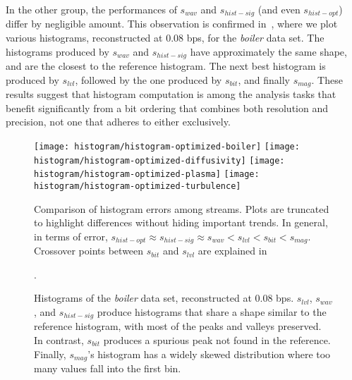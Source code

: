 In the other group, the performances of $s_{wav}$ and $s_{hist-sig}$ (and even $s_{hist-opt}$)
differ by negligible amount. This observation is confirmed in~, where we
plot various histograms, reconstructed at 0.08 bps, for the \emph{boiler} data set. The histograms
produced by $s_{wav}$ and $s_{hist-sig}$ have approximately the same shape, and are the closest to
the reference histogram. The next best histogram is produced by $s_{lvl}$, followed by the one
produced by $s_{bit}$, and finally $s_{mag}$. These results suggest that histogram computation is
among the analysis tasks that benefit significantly from a bit ordering that combines both
resolution and precision, not one that adheres to either exclusively.

\begin{figure*}[h]
	\centering
	{\texttt{[image: histogram/histogram-optimized-boiler]}}
	{\texttt{[image: histogram/histogram-optimized-diffusivity]}}
	{\texttt{[image: histogram/histogram-optimized-plasma]}}
	{\texttt{[image: histogram/histogram-optimized-turbulence]}}
	\caption{Comparison of histogram errors among streams. Plots are truncated to highlight
	differences without hiding important trends. In general, in terms of error, $s_{hist-opt}\approx
	s_{hist-sig}\approx s_{wav} < s_{lvl} < s_{bit} < s_{mag}$. Crossover points between $s_{bit}$ and
	$s_{lvl}$ are explained in~}.
	\label{fig:histogram-stream-comparison}
\vspace{1em}

	\centering
	\caption{Histograms of the \emph{boiler} data set, reconstructed at 0.08 bps. $s_{lvl}$,
	$s_{wav}$, and $s_{hist-sig}$ produce histograms that share a shape similar to the reference
	histogram, with most of the peaks and valleys preserved. In contrast, $s_{bit}$ produces a
	spurious peak not found in the reference. Finally, $s_{mag}$'s histogram has a widely skewed
	distribution where too many values fall into the first bin.}
	\label{fig:histograms-boiler}
\end{figure*}

